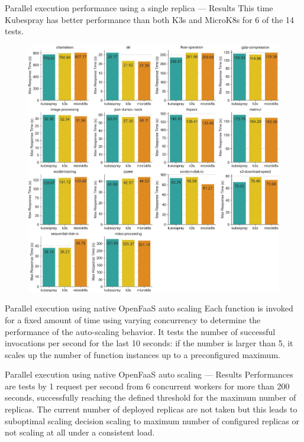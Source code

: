 \begin{frame}{Parallel execution performance using a single replica — Results}
This time Kubespray has better performance than both K3s and MicroK8s for 6 of the 14 tests.

\begin{figure}
    \centering
    \includegraphics[width=0.5\linewidth]{static/11227_2022_4430_Fig6_HTML.jpg}
\end{figure}
\end{frame}

\begin{frame}{Parallel execution using native OpenFaaS auto scaling}
Each function is invoked for a fixed amount of time using varying concurrency to determine the performance of the auto-scaling behavior.
\pause
It tests the number of successful invocations per second for the last 10 seconds: if the number is larger than 5, it scales up the number of function instances up to a preconfigured maximum.
\end{frame}


\begin{frame}{Parallel execution using native OpenFaaS auto scaling  — Results}
Performances are tests by 1 request per second from 6 concurrent workers for more than 200 seconds, successfully reaching the defined threshold for the maximum number of replicas.
The current number of deployed replicas are not taken but this leads to suboptimal scaling decision scaling to maximum number of configured replicas or not scaling at all under a consistent load.
\end{frame}


